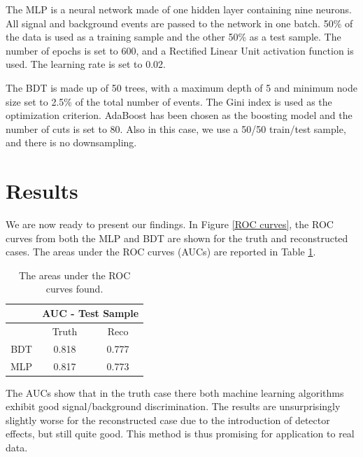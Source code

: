 \documentclass[10pt,a4paper]{book}
\begin{document}
The MLP is a neural network made of one hidden layer containing nine neurons. All signal and background events are passed to the network in one batch. 50\% of the data is used as a training sample and the other 50\% as a test sample. The number of epochs is set to 600, and a Rectified Linear Unit activation function is used. The learning rate is set to 0.02. 

The BDT is made up of 50 trees, with a maximum depth of 5 and minimum node size set to 2.5\% of the total number of events. The Gini index is used as the optimization criterion. AdaBoost has been chosen as the boosting model and the number of cuts is set to 80. Also in this case, we use a 50/50 train/test sample, and there is no downsampling.


\section{Results}

We are now ready to present our findings. In Figure \ref{ROC curves}, the ROC curves from both the MLP and BDT are shown for the truth and reconstructed cases. The areas under the ROC curves (AUCs) are reported in Table \ref{AUC table}.

\begin{table}[h!]
\centering
\begin{tabular}{|c|c|c|}
\hline 
\* & \multicolumn{2}{c|}{AUC - Test Sample} \\ 
\hline 
\* & Truth & Reco \\ 
\hline 
BDT & 0.818 & 0.777 \\ 
\hline 
MLP & 0.817 & 0.773 \\  
\hline 
\end{tabular} 
\caption{The areas under the ROC curves found.}
\label{AUC table}
\end{table} 

The AUCs show that in the truth case there both machine learning algorithms exhibit good signal/background discrimination. The results are unsurprisingly slightly worse for the reconstructed case due to the introduction of detector effects, but still quite good. This method is thus promising for application to real data.
\end{document}
